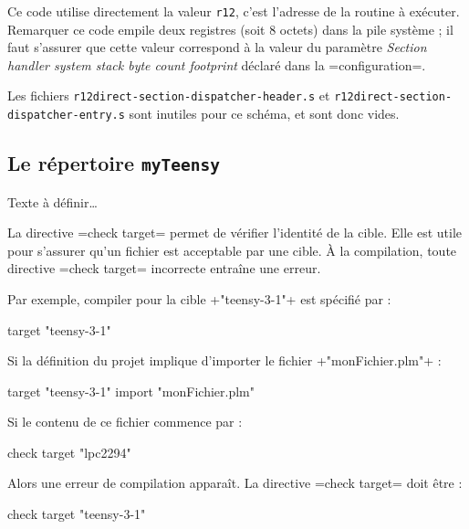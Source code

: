 Ce code utilise directement la valeur \texttt{r12}, c'est l'adresse de la routine à exécuter. Remarquer ce code empile deux registres (soit 8 octets) dans la pile système ; il faut s'assurer que cette valeur correspond à la valeur du paramètre \emph{Section handler system stack byte count footprint} déclaré dans la \plm=configuration=.


Les fichiers \texttt{r12direct-section-dispatcher-header.s} et \texttt{r12direct-section-dispatcher-entry.s} sont inutiles pour ce schéma, et sont donc vides.










\subsection{Le répertoire \texttt{myTeensy}}

Texte à définir…





La directive \plm=check target= permet de vérifier l'identité de la cible. Elle est utile pour s'assurer qu'un fichier est acceptable par une cible. À la compilation, toute directive \plm=check target= incorrecte entraîne une erreur.

Par exemple, compiler pour la cible \plm+"teensy-3-1"+ est spécifié par :

\begin{PLM}
target "teensy-3-1"
\end{PLM}

Si la définition du projet implique d'importer le fichier \plm+"monFichier.plm"+ :

\begin{PLM}
target "teensy-3-1"
import "monFichier.plm"
\end{PLM}

Si le contenu de ce fichier commence par :
\begin{PLM}
check target "lpc2294"
\end{PLM}

Alors une erreur de compilation apparaît. La directive \plm=check target= doit être :
\begin{PLM}
check target "teensy-3-1"
\end{PLM}

